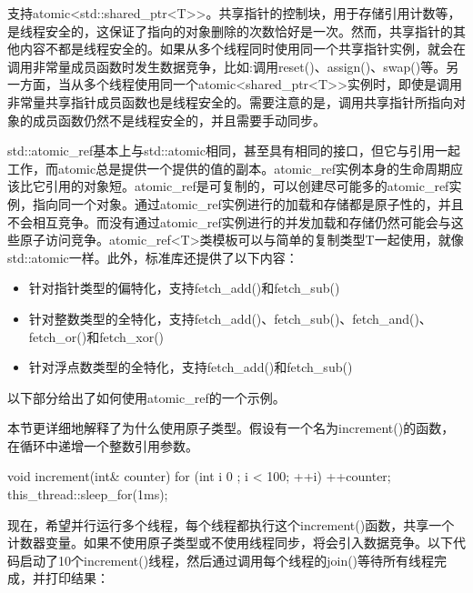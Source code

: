 
支持atomic<std::shared\_ptr<T>{}>。共享指针的控制块，用于存储引用计数等，是线程安全的，这保证了指向的对象删除的次数恰好是一次。然而，共享指针的其他内容不都是线程安全的。如果从多个线程同时使用同一个共享指针实例，就会在调用非常量成员函数时发生数据竞争，比如:调用reset()、assign()、swap()等。另一方面，当从多个线程使用同一个atomic<shared\_ptr<T>{}>实例时，即使是调用非常量共享指针成员函数也是线程安全的。需要注意的是，调用共享指针所指向对象的成员函数仍然不是线程安全的，并且需要手动同步。


std::atomic\_ref基本上与std::atomic相同，甚至具有相同的接口，但它与引用一起工作，而atomic总是提供一个提供的值的副本。atomic\_ref实例本身的生命周期应该比它引用的对象短。atomic\_ref是可复制的，可以创建尽可能多的atomic\_ref实例，指向同一个对象。通过atomic\_ref实例进行的加载和存储都是原子性的，并且不会相互竞争。而没有通过atomic\_ref实例进行的并发加载和存储仍然可能会与这些原子访问竞争。atomic\_ref<T>类模板可以与简单的复制类型T一起使用，就像std::atomic一样。此外，标准库还提供了以下内容：

\begin{itemize}
\item
针对指针类型的偏特化，支持fetch\_add()和fetch\_sub()

\item
针对整数类型的全特化，支持fetch\_add()、fetch\_sub()、fetch\_and()、fetch\_or()和fetch\_xor()

\item
针对浮点数类型的全特化，支持fetch\_add()和fetch\_sub()
\end{itemize}

以下部分给出了如何使用atomic\_ref的一个示例。


本节更详细地解释了为什么使用原子类型。假设有一个名为increment()的函数，在循环中递增一个整数引用参数。

\begin{cpp}
void increment(int& counter)
{
    for (int i { 0 }; i < 100; ++i) {
        ++counter;
        this_thread::sleep_for(1ms);
    }
}
\end{cpp}

现在，希望并行运行多个线程，每个线程都执行这个increment()函数，共享一个计数器变量。如果不使用原子类型或不使用线程同步，将会引入数据竞争。以下代码启动了10个increment()线程，然后通过调用每个线程的join()等待所有线程完成，并打印结果：

